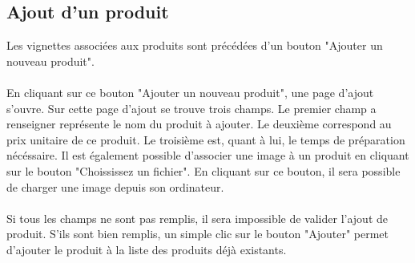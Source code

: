 \subsection{Ajout d'un produit}
Les vignettes associées aux produits sont précédées d'un bouton "Ajouter un 
nouveau produit".

\paragraph{}
En cliquant sur ce bouton "Ajouter un nouveau produit", une page d'ajout s'ouvre.
Sur cette page d'ajout se trouve trois champs. Le premier champ a renseigner 
représente le nom du produit à ajouter. Le deuxième correspond au prix unitaire 
de ce produit. Le troisième est, quant à lui, le temps de préparation nécéssaire.
Il est également possible d'associer une image à un produit en cliquant sur le 
bouton "Choississez un fichier". En cliquant sur ce bouton, il sera possible de 
charger une image depuis son ordinateur.

\paragraph{}
Si tous les champs ne sont pas remplis, il sera impossible de valider l'ajout de 
produit. S'ils sont bien remplis, un simple clic sur le bouton "Ajouter" 
permet d'ajouter le produit à la liste des produits déjà existants. 
